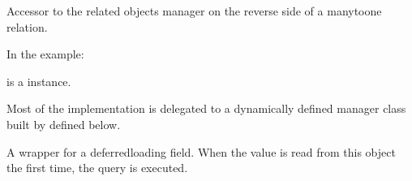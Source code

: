 \documentclass[letterpaper,10pt,english]{sphinxmanual}
\begin{document}
\begin{fulllineitems}
\begin{fulllineitems}
\label{\detokenize{expensesApp:expensesApp.models.Category._meta}}
\pysigstartsignatures
\pysigline
{}
\pysigstopsignatures
\end{fulllineitems}


\begin{fulllineitems}
\label{\detokenize{expensesApp:expensesApp.models.Category.expense_set}}
\pysigstartsignatures
\pysigline
{}
\pysigstopsignatures
\sphinxAtStartPar
Accessor to the related objects manager on the reverse side of a
many\sphinxhyphen{}to\sphinxhyphen{}one relation.

\sphinxAtStartPar
In the example:

\begin{sphinxVerbatim}[commandchars=\\\{\}]
       
\end{sphinxVerbatim}

\sphinxAtStartPar
{} is a  instance.

\sphinxAtStartPar
Most of the implementation is delegated to a dynamically defined manager
class built by  defined below.

\end{fulllineitems}


\begin{fulllineitems}
\label{\detokenize{expensesApp:expensesApp.models.Category.id}}
\pysigstartsignatures
\pysigline
{}
\pysigstopsignatures
\sphinxAtStartPar
A wrapper for a deferred\sphinxhyphen{}loading field. When the value is read from this
object the first time, the query is executed.


\end{fulllineitems}
\end{fulllineitems}
\end{document}
